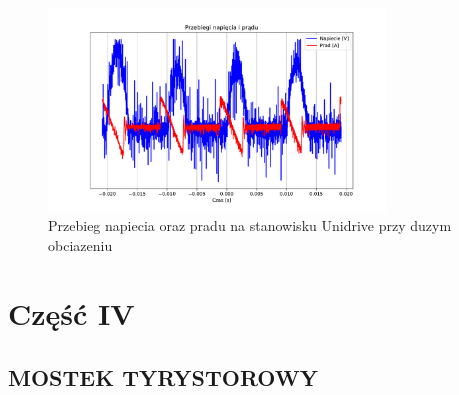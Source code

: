 \documentclass[11pt]{article}
\begin{document}
\begin{figure}[H]
\centering
\includegraphics[width=0.8\textwidth]{aun1_dml_obciazenie_hard.pdf}
\caption{Przebieg napiecia oraz pradu na stanowisku Unidrive przy duzym obciazeniu}
\end{figure}


\section{Część IV}

\subsection{MOSTEK TYRYSTOROWY}
\end{document}
